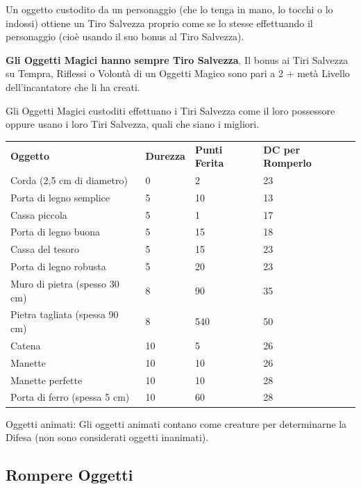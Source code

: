 \documentclass[a4paper,11pt,twoside,openany]{book}
\begin{document}
Un oggetto custodito da un personaggio (che lo tenga in mano, lo tocchi o lo indossi) ottiene un Tiro Salvezza proprio come se lo stesse effettuando il personaggio (cioè usando il suo bonus al Tiro Salvezza).

\textbf{Gli Oggetti Magici hanno sempre Tiro Salvezza}. Il bonus ai Tiri Salvezza su Tempra, Riflessi o Volontà di un Oggetti Magico sono pari a 2 + metà Livello dell'incantatore che li ha creati.

Gli Oggetti Magici custoditi effettuano i Tiri Salvezza come il loro possessore oppure usano i loro Tiri Salvezza, quali che siano i migliori.

\bigskip

\begin{tabular}{L{6cm} L{3cm} L{3cm} L{3cm}}
	\toprule
	\textbf{Oggetto}& \textbf{Durezza} & \textbf{Punti Ferita} & \textbf{DC per Romperlo}\\
	Corda (2,5 cm di diametro)     & 0      & 2           & 23\\
	Porta di legno semplice        & 5      & 10          & 13\\
	Cassa piccola                  & 5      & 1           & 17\\
	Porta di legno buona           & 5      & 15          & 18\\
	Cassa del tesoro               & 5      & 15          & 23\\
	Porta di legno robusta         & 5      & 20          & 23\\
	Muro di pietra (spesso 30 cm)  & 8      & 90          & 35\\
	Pietra tagliata (spessa 90 cm) & 8      & 540         & 50\\
	Catena                         & 10     & 5           & 26\\
	Manette                        & 10     & 10          & 26\\
	Manette perfette               & 10     & 10          & 28\\
	Porta di ferro (spessa 5 cm)   & 10     & 60          & 28\\
\end{tabular}

\bigskip

Oggetti animati: Gli oggetti animati contano come creature per determinarne la Difesa (non sono considerati oggetti inanimati).

\subsection{Rompere Oggetti}
\end{document}
